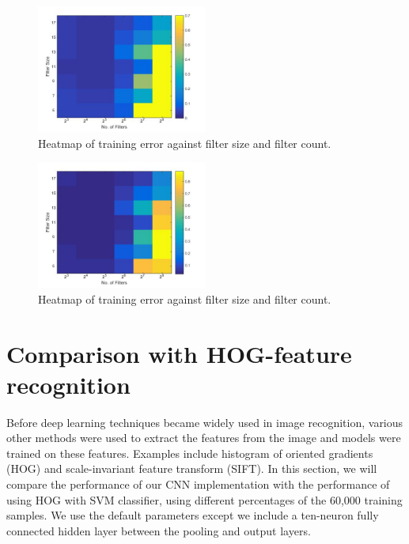 \documentclass[10pt,twocolumn]{article}
\begin{document}
\begin{figure}
\centering
\includegraphics[width = 0.5\textwidth]{figure/fs_fc_train_heatmap}
\caption{Heatmap of training error against filter size and filter count.}
\label{fig:fs_fc_train_heatmap}
\end{figure}

\begin{figure}
\centering
\includegraphics[width = 0.5\textwidth]{figure/fs_fc_test_heatmap}
\caption{Heatmap of training error against filter size and filter count.}
\label{fig:fs_fc_test_heatmap}
\end{figure}

\section{Comparison with HOG-feature recognition} \label{sec:evalfeature}

Before deep learning techniques became widely used in image recognition, various other methods were used to extract the features from the image and models were trained on these features. Examples include histogram of oriented gradients (HOG) and scale-invariant feature transform (SIFT). In this section, we will compare the performance of our CNN implementation with the performance of using HOG with SVM classifier, using different percentages of the 60,000 training samples. We use the default parameters except we include a ten-neuron fully connected hidden layer between the pooling and output layers.
\end{document}
